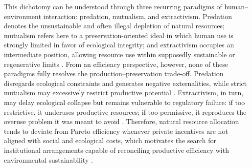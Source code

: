







This dichotomy can be understood through three recurring paradigms of human--environment interaction: predation, mutualism, and extractivism. Predation denotes the unsustainable and often illegal depletion of natural resources; mutualism refers here to a preservation-oriented ideal in which human use is strongly limited in favor of ecological integrity; and extractivism occupies an intermediate position, allowing resource use within supposedly sustainable or regenerative limits \cite{gudynas2009diez, acosta2013extractivism}. From an efficiency perspective, however, none of these paradigms fully resolves the production--preservation trade-off. Predation disregards ecological constraints and generates negative externalities, while strict mutualism may excessively restrict productive potential \cite{dasgupta2001human, ostrom1990commons}. Extractivism, in turn, may delay ecological collapse but remains vulnerable to regulatory failure: if too restrictive, it underuses productive resources; if too permissive, it reproduces the overuse problem it was meant to avoid \cite{chichilnisky2017north}. Therefore, natural resource allocation tends to deviate from Pareto efficiency whenever private incentives are not aligned with social and ecological costs, which motivates the search for institutional arrangements capable of reconciling productive efficiency with environmental sustainability \cite{hanley2007environmental}.

